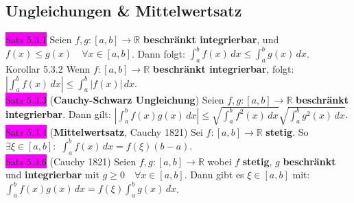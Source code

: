 \documentclass[landscape, 10pt]{article}
\newcommand{\R}{\mathbb{R}}
\begin{document}
\begin{multicols}{3}
       \subsection{Ungleichungen \& Mittelwertsatz}
              \colorbox{magenta}{Satz 5.3.1} 
                     Seien \textcolor{NavyBlue}{$f,g:[a,b]\longrightarrow\R$}
                     \textbf{beschränkt integrierbar}, und 
                     \textcolor{NavyBlue}{
                     $f(x)\leqslant g(x)\quad\forall x\in[a,b]$}.
                     Dann folgt: \textcolor{NavyBlue}{
                     $\int_a^bf(x)\,dx\leqslant\int_a^bg(x)\,dx$}. \\
              \colorbox{BurntOrange}{Korollar 5.3.2} 
                     Wenn \textcolor{NavyBlue}{$f:[a,b]\longrightarrow\R$} 
                     \textbf{beschränkt integrierbar}, folgt: 
                     \textcolor{NavyBlue}{
                     $|\int_a^bf(x)\,dx|\leqslant\int_a^b|f(x)|\,dx$}.\\
              \colorbox{magenta}{Satz 5.3.3} 
              (\textbf{Cauchy-Schwarz Ungleichung}) 
                     Seien \textcolor{NavyBlue}{$f,g:[a,b]\longrightarrow\R$}
                     \textbf{beschränkt integrierbar}. Dann gilt: 
                     \textcolor{NavyBlue}{$|\int_a^bf(x)g(x)\,dx|
                     \leqslant\sqrt{\int_a^bf^2(x)\,dx}
                     \sqrt{\int_a^bg^2(x)\,dx}$}.\\
              \colorbox{magenta}{Satz 5.3.4} 
              (\textbf{Mittelwertsatz}, Cauchy 1821) 
                     Sei \textcolor{NavyBlue}{$f:[a,b]\longrightarrow\R$} 
                     \textbf{stetig}. So 
                     \textcolor{NavyBlue}{$\exists\xi\in[a,b]$}:\, 
                     \textcolor{NavyBlue}{$\int_a^bf(x)\,dx=f(\xi)(b-a)$}.\\
              \colorbox{magenta}{Satz 5.3.6} (Cauchy 1821) Seien 
                     \textcolor{NavyBlue}{$f,g:[a,b]\longrightarrow\R$} wobei 
                     \textcolor{NavyBlue}{$f$} \textbf{stetig}, 
                     \textcolor{NavyBlue}{$g$} \textbf{beschränkt} und 
                     \textbf{integrierbar} mit 
                     \textcolor{NavyBlue}{$g\geqslant0\quad\forall x\in[a,b]$}. 
                     Dann gibt es \textcolor{NavyBlue}{$\xi\in[a,b]$} mit: 
                     \textcolor{NavyBlue}{
                     $\int_a^bf(x)g(x)\,dx
                     =f(\xi)\int_a^bg(x)\,dx$}.

\end{multicols}
\end{document}
